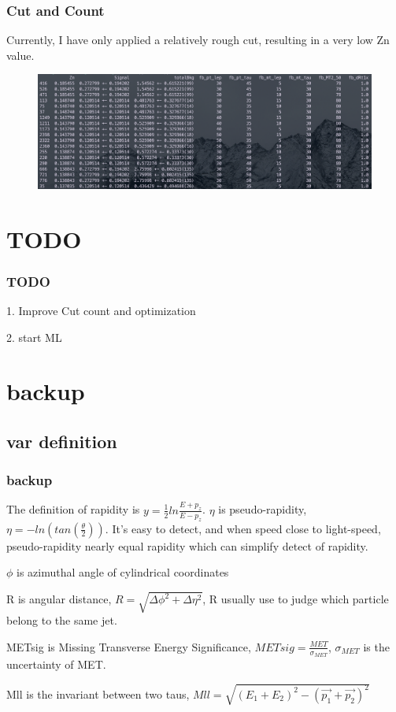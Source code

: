 \documentclass[usenames,dvipsnames]{beamer}
\begin{document}
\begin{frame}
	\frametitle{Cut and Count}
	Currently, I have only applied a relatively rough cut, resulting in a very low Zn value.
	\begin{figure}
		\centering
		\includegraphics[width = 1.0\textwidth]{graphics/cutcount.png}
		\label{cutcount}
	\end{figure}
\end{frame}

\section{TODO}
\begin{frame}
	\frametitle{TODO}
	1. Improve Cut count and optimization
	
	2. start ML
	
\end{frame}


\section{backup}
\subsection{var definition}
\begin{frame}
	\frametitle{backup}
	The definition of rapidity is $y = \frac{1}{2}ln\frac{E+p_z}{E-p_z}$. $\eta$ is pseudo-rapidity, $\eta = -ln(tan(\frac{\theta}{2})).$ It's easy to detect, and when speed close to light-speed, pseudo-rapidity nearly equal rapidity which can simplify detect of rapidity.
	
	$\phi$ is azimuthal angle of cylindrical coordinates
	
	R is angular distance, $R = \sqrt{\Delta\phi^2+\Delta\eta^2}$, R usually use to judge which particle belong to the same jet.
	
	METsig is Missing Transverse Energy Significance, $METsig = \frac{MET}{\sigma_{MET}}$, $\sigma_{MET}$ is the uncertainty of MET.
	
	Mll is the invariant between two taus, $Mll = \sqrt{(E_1 + E_2)^2 - (\vec{p_1}+\vec{p_2})^2}$
\end{frame}
\end{document}

